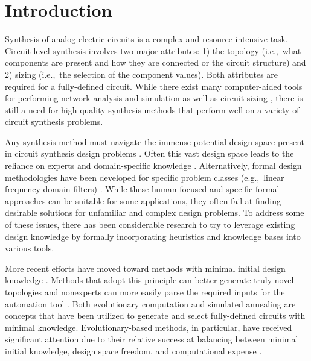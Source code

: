 \section{Introduction\label{sec:ch6:introduction}}

Synthesis of analog electric circuits is a complex and resource-intensive task.
Circuit-level synthesis involves two major attributes: 1) the topology (i.e.,~what components are present and how they are connected or the circuit structure) and 2) sizing (i.e.,~the selection of the component values).
Both attributes are required for a fully-defined circuit.
While there exist many computer-aided tools for performing network analysis and simulation \cite{Grimbleby1995a} as well as circuit sizing \cite{Das2007a}, there is still a need for high-quality synthesis methods that perform well on a variety of circuit synthesis problems.

Any synthesis method must navigate the immense potential design space present in circuit synthesis design problems \cite{Mitea2011a}.
Often this vast design space leads to the reliance on experts and domain-specific knowledge \cite{Gan2010a}.
Alternatively, formal design methodologies have been developed for specific problem classes (e.g.,~linear frequency-domain filters) \cite{Grimbleby2000a}.
While these human-focused and specific formal approaches can be suitable for some applications, they often fail at finding desirable solutions for unfamiliar and complex design problems.
To address some of these issues, there has been considerable research to try to leverage existing design knowledge by formally incorporating heuristics \cite{Sussman1975a} and knowledge bases \cite{Harjani1989a} into various tools.

More recent efforts have moved toward methods with minimal initial design knowledge \cite{Das2007a,  Grimbleby1995a, Gan2010a, Das2008a,  Lohn1999a}.
Methods that adopt this principle can better generate truly novel topologies and nonexperts can more easily parse the required inputs for the automation tool \cite{Das2007a, Grimbleby1995a, Goh2001a, Grimbleby2000a, Lohn1999a}.
Both evolutionary computation \cite{Das2007a, Das2008a, Gan2010a, Grimbleby1995a, Goh2001a, Grimbleby2000a, Koza1997a, Lohn1999a} and simulated annealing \cite{Ochotta1996a} are concepts that have been utilized to generate and select fully-defined circuits with minimal knowledge.
Evolutionary-based methods, in particular, have received significant attention due to their relative success at balancing between minimal initial knowledge, design space freedom, and computational expense \cite{Das2007a}.


